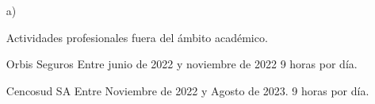 \begin{enumerate}[leftmargin=0.8cm]

  \item[a)]{Actividades profesionales fuera del ámbito académico.

    \begin{itemize}[leftmargin=0.2cm]

      {Orbis Seguros}
      {Entre junio de 2022 y noviembre de 2022 9 horas por día.}
      {}

      {Cencosud SA}
      {Entre Noviembre de 2022 y Agosto de 2023. 9 horas por día.}
      {}

    \end{itemize}

  }

\end{enumerate}
